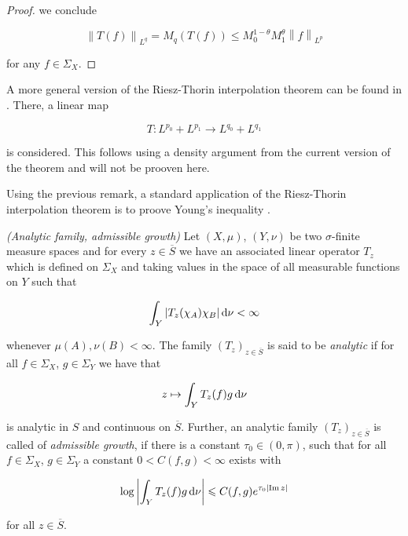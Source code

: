 \begin{proof}
we conclude 
	
\begin{equation*}
	\left\| T(f)\right\|_{L^q} = M_q\left( T(f) \right) \leqslant M_0^{1 - \theta}M_1^\theta \left\|f\right\|_{L^p}
\end{equation*}
	
for any $f \in \Sigma_X$.
\end{proof}

\begin{remark*}
	A more general version of the Riesz-Thorin interpolation theorem can be found in \textup{\cite[200--202]{folland:real_analysis:1999}}. There, a linear map 

	\begin{equation*}
		T: L^{p_0} + L^{p_1} \rightarrow L^{q_0} + L^{q_1}
	\end{equation*}

	is considered. This follows using a density argument from the current version of the theorem and will not be prooven here.
	\label{rem:extension}
\end{remark*}

\begin{remark*}
	Using the previous remark, a standard application of the Riesz-Thorin interpolation theorem is to proove Young's inequality \textup{\cite[22--23]{grafakos:fourier:2014}}.
\end{remark*}

\begin{mdframed}
	\begin{definition}\emph{(Analytic family, admissible growth)}
		Let $(X,\mu)$, $(Y,\nu)$ be two $\sigma$-finite measure spaces and for every $z \in \overline{S}$ we have an associated linear operator $T_z$ which is defined on $\Sigma_X$ and taking values in the space of all measurable functions on $Y$ such that

		\begin{equation*}
			\int_Y \left| T_z(\chi_A)\chi_B \right| \mathop{}\!\mathrm{d}\nu < \infty
		\end{equation*}

		whenever $\mu(A),\nu(B) < \infty$. The family $\left( T_z \right)_{z \in \overline{S}}$ is said to be \emph{analytic} if for all $f \in \Sigma_X$, $g \in \Sigma_Y$ we have that

		\begin{equation*}
			z \mapsto \int_Y T_z(f)g\mathop{}\!\mathrm{d}\nu
		\end{equation*}

		is analytic in $S$ and continuous on $\overline{S}$. Further, an analytic family $\left( T_z \right)_{z \in \overline{S}}$ is called of \emph{admissible growth}, if there is a constant $\tau_0 \in (0,\pi)$, such that for all $f \in \Sigma_X$, $g \in \Sigma_Y$ a constant $0 < C(f,g) < \infty$ exists with

			\begin{equation*}
				\log\left| \int_Y T_z(f) g \mathop{}\!\mathrm{d}\nu\right| \leqslant C(f,g)e^{\tau_0\left| \operatorname{Im} z\right|}
			\end{equation*}

			for all $z \in \overline{S}$.
	\end{definition}
\end{mdframed}

